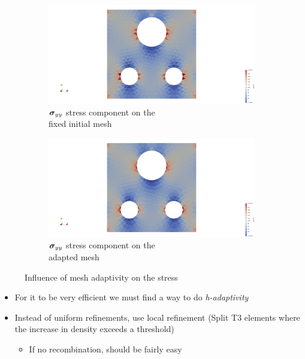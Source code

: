 \begin{figure}
	\begin{subfigure}[t]{0.5\linewidth}
		\centering
		\includegraphics[width=\linewidth]{Figures/Fixed_mesh_sigma_yy.png}
		\caption{$\mathcal{\boldsymbol{\sigma}}_{yy}$ stress component on the \\fixed initial mesh}
	\end{subfigure}
	\begin{subfigure}[t]{0.5\linewidth}
		\centering
		\includegraphics[width=\linewidth]{Figures/Free_mesh_sigma_yy.png}
		\caption{$\mathcal{\boldsymbol{\sigma}}_{yy}$ stress component on the \\adapted mesh}
	\end{subfigure}  
	\caption{Influence of mesh adaptivity on the stress}
	\label{fig:r-adaptivity}
\end{figure}


\begin{itemize}
	\item For it to be very efficient we must find a way to do \textit{h-adaptivity}
	\item Instead of uniform refinements, use local refinement (Split T3 elements where the increase in density exceeds a threshold)
	\begin{itemize}
		\item If no recombination, should be fairly easy
	\end{itemize}
\end{itemize}

